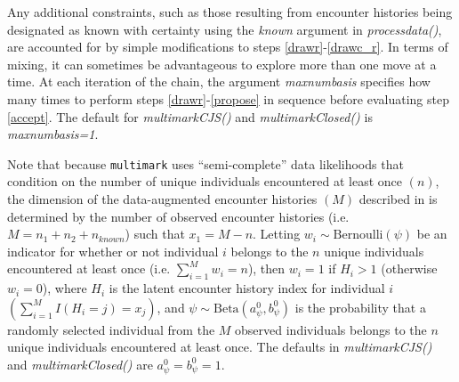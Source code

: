 \documentclass[12pt]{article}
\begin{document}
Any additional constraints, such as those resulting from encounter histories being designated as known with certainty using the \textit{known} argument in \textit{processdata()}, are accounted for by simple modifications to steps \ref{drawr}-\ref{drawc_r}. In terms of mixing, it can sometimes be advantageous to explore more than one move at a time. At each iteration of the chain, the argument \textit{maxnumbasis} specifies how many times to perform steps \ref{drawr}-\ref{propose} in sequence before evaluating step \ref{accept}. The default for \textit{multimarkCJS()} and \textit{multimarkClosed()} is \textit{maxnumbasis=1}.

Note that because \verb|multimark| uses ``semi-complete'' data likelihoods that condition on the number of unique individuals encountered at least once $(n)$, the dimension of the data-augmented encounter histories $(M)$ described in \cite{McClintockEtAl2014} is determined by the number of observed encounter histories (i.e. $M=n_1+n_2+n_{known}$) such that $x_1=M-n$. Letting $w_i \sim \text{Bernoulli} \left(\psi\right)$ be an indicator for whether or not individual $i$ belongs to the $n$ unique individuals encountered at least once (i.e. $\sum_{i=1}^M w_i = n$), then $w_i=1$ if $H_i>1$ (otherwise $w_i=0$), where $H_i$ is the latent encounter history index for individual $i$ $\left(\sum_{i=1}^M I(H_i=j) = x_j\right)$, and $\psi \sim \text{Beta}\left(a^0_\psi,b^0_\psi\right)$ is the probability that a randomly selected individual from the $M$ observed individuals belongs to the $n$ unique individuals encountered at least once. The defaults in \textit{multimarkCJS()} and \textit{multimarkClosed()} are $a^0_\psi=b^0_\psi=1$.



\end{document}
